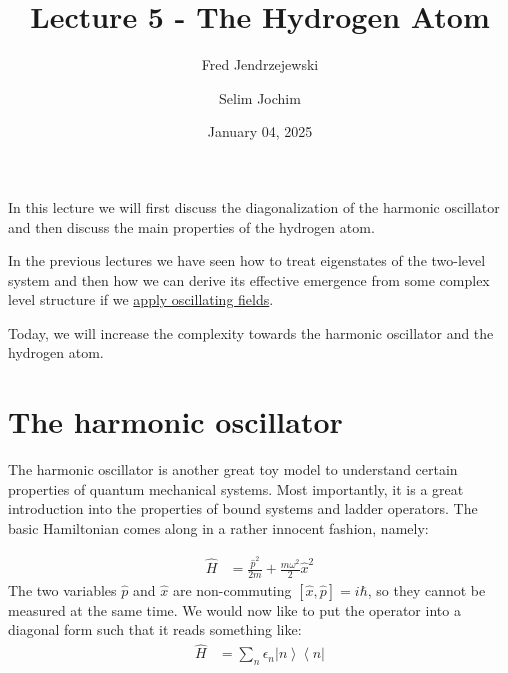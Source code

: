 \documentclass[10pt]{article}
\renewenvironment{abstract}
  {{\bfseries\noindent{\abstractname}\par\nobreak}\footnotesize}
  {\bigskip}
\newcommand{\bra}[1]{\ensuremath{\left\langle#1\right|}}
\newcommand{\ket}[1]{\ensuremath{\left|#1\right\rangle}}
\begin{document}
\title{Lecture 5 - The Hydrogen Atom}



\author[1]{Fred Jendrzejewski}%
\author[2]{Selim Jochim}%
%
%


\vspace{-1em}



  
  \date{January 04, 2025}


\begingroup
\let\center\flushleft
\let\endcenter\endflushleft
\maketitle
\endgroup





\begin{abstract}
In this lecture we will first discuss the diagonalization of the harmonic oscillator and then discuss the main properties of the hydrogen atom.%
\end{abstract}%



\sloppy


In the previous lectures we have seen how to treat eigenstates of the two-level system and then how we can derive its effective emergence from some complex level structure if we \href{https://www.authorea.com/users/143341/articles/326506-lecture-4-atoms-in-oscillating-fields}{apply oscillating fields}.

Today, we will increase the complexity towards the harmonic oscillator and the hydrogen atom.


\section{The harmonic oscillator}

The harmonic oscillator is another great toy model to understand certain properties of quantum mechanical systems. Most importantly, it is a great introduction into the properties of bound systems and ladder operators. The basic Hamiltonian comes along in a rather innocent fashion, namely:

\begin{align}\label{Eq:HamHO}
\hat{H} &= \frac{\hat{p}^2}{2m}+ \frac{m\omega^2}{2}\hat{x}^2
\end{align}
The two variables $\hat{p}$ and $\hat{x}$ are non-commuting $[\hat{x}, \hat{p}] = i\hbar$, so they cannot be measured at the same time. We would now like to put the operator into a diagonal form such that it reads something like:
\begin{align}\label{Eq:HamHO}
\hat{H} &= \sum_n \epsilon_n \ket{n}\bra{n}
\end{align}
\end{document}
